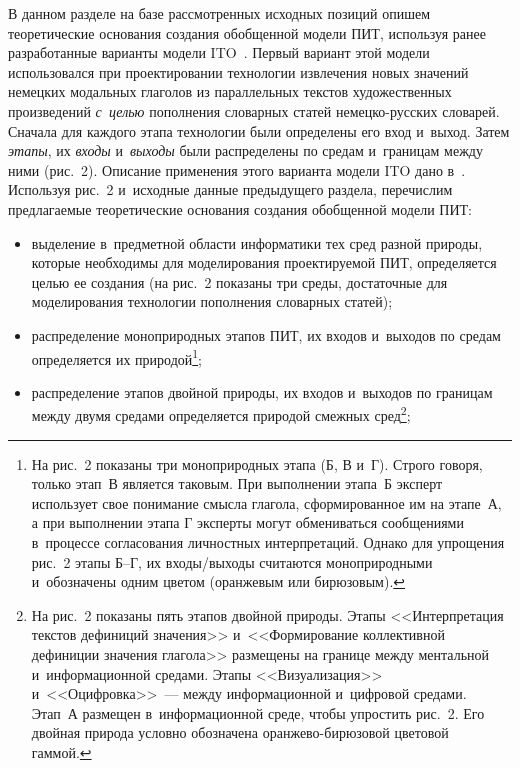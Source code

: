 \begin{multicols}{2}
  В данном разделе на базе рассмотренных исходных позиций опишем 
теоретические основания создания обобщенной модели ПИТ, используя 
ранее разработанные варианты модели  
ITO~\cite{14-zac, 19-zac, 20-zac, 21-zac}. Первый вариант этой модели 
использовался при проектировании технологии извлечения новых значений 
немецких модальных глаголов из параллельных текс\-тов художественных 
произведений \textit{с~\mbox{целью}} пополнения словарных статей  
не\-мец\-ко-рус\-ских словарей. Сначала для каждого этапа технологии были 
определены его вход и~выход. Затем \textit{этапы}, их \textit{входы} 
и~\textit{выходы} были распределены по средам и~границам между ними 
(рис.~2). Описание применения этого варианта модели ITO дано  
в~\cite{14-zac}. Используя рис.~2 и~исходные данные предыдущего раздела, 
перечислим предлагаемые теоретические основания создания обобщенной 
модели ПИТ:
  \begin{itemize}
  \item выделение в~предметной области информатики тех сред разной 
природы, которые необходимы для моделирования проектируемой ПИТ, 
определяется \mbox{целью} ее создания (на рис.~2 показаны три среды, достаточные 
для моделирования технологии пополнения словарных статей);
  \item распределение моноприродных этапов ПИТ, их входов и~выходов по 
средам определяется их природой\footnote{На рис.~2 показаны три моноприродных 
этапа (Б, В и~Г). Строго говоря, только этап~В является таковым. При выполнении этапа~Б эксперт 
использует свое понимание смысла глагола, сформированное им на этапе~А, а при выполнении 
этапа Г эксперты могут обмениваться сообщениями в~процессе согласования личностных 
интерпретаций. Однако для упрощения рис.~2 этапы Б--Г, их вхо\-ды/вы\-хо\-ды считаются 
моноприродными и~обозначены одним цветом (оранжевым или бирюзовым).};
  \item распределение этапов двойной природы, их входов и~выходов по 
границам между двумя средами определяется природой смежных 
сред\footnote{На рис.~2 показаны пять этапов двойной природы. Этапы <<Интерпретация 
текстов дефиниций значения>> и~<<Формирование коллективной дефиниции значения глагола>> 
размещены на границе между ментальной и~информационной средами. Этапы <<Визуализация>> 
и~<<Оцифровка>>~--- между информационной и~цифровой средами. Этап~А размещен 
в~информационной среде, чтобы упростить рис.~2. Его двойная природа условно обозначена 
оранжево-бирюзовой цветовой гаммой.}; 
\end{itemize}

\end{multicols}

